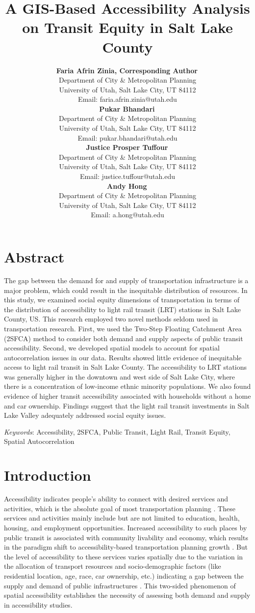 \documentclass[numbered]{trbunofficial}
\title{A GIS-Based Accessibility Analysis on Transit Equity in Salt Lake County}
\author{%
  \textbf{Faria Afrin Zinia, Corresponding Author\,\orcidlink{0000-0001-6525-1968}}\\
  Department of City \& Metropolitan Planning\\
  University of Utah, Salt Lake City, UT 84112\\
  Email: faria.afrin.zinia@utah.edu\\
  \hfill\break%
  \textbf{Pukar Bhandari\,\orcidlink{0000-0002-1043-2937}}\\
  Department of City \& Metropolitan Planning\\
  University of Utah, Salt Lake City, UT 84112\\
  Email: pukar.bhandari@utah.edu\\
    \hfill\break%
  \textbf{Justice Prosper Tuffour\,\orcidlink{0000-0001-8672-6854}}\\
  Department of City \& Metropolitan Planning\\
  University of Utah, Salt Lake City, UT 84112\\
  Email: justice.tuffour@utah.edu\\
    \hfill\break%
  \textbf{Andy Hong\,\orcidlink{0000-0002-1295-1431}}\\
  Department of City \& Metropolitan Planning\\
  University of Utah, Salt Lake City, UT 84112\\
  Email: a.hong@utah.edu\\
}
\begin{document}
\maketitle

\section{Abstract}

 The gap between the demand for and supply of transportation infrastructure is a major problem, which could result in the inequitable distribution of resources. In this study, we examined social equity dimensions of transportation in terms of the distribution of accessibility to light rail transit (LRT) stations in Salt Lake County, US. This research employed two novel methods seldom used in transportation research. First, we used the Two-Step Floating Catchment Area (2SFCA) method to consider both demand and supply aspects of public transit accessibility. Second, we developed spatial models to account for spatial autocorrelation issues in our data. Results showed little evidence of inequitable access to light rail transit in Salt Lake County. The accessibility to LRT stations was generally higher in the downtown and west side of Salt Lake City, where there is a concentration of low-income ethnic minority populations. We also found evidence of higher transit accessibility associated with households without a home and car ownership. Findings suggest that the light rail transit investments in Salt Lake Valley adequately addressed social equity issues.

\hfill\break%
\noindent\textit{Keywords}: Accessibility, 2SFCA, Public Transit, Light Rail, Transit Equity, Spatial Autocorrelation
\newpage

\section{Introduction}
Accessibility indicates people’s ability to connect with desired services and activities, which is the absolute goal of most transportation planning \cite{Litman2021}.  These services and activities mainly include but are not limited to education, health, housing, and employment opportunities.  Increased accessibility to such places by public transit is associated with community livability and economy, which results in the paradigm shift to accessibility-based transportation planning growth \cite{Hansen1959,Iacono2010,Litman2021}.  But the level of accessibility to these services varies spatially due to the variation in the allocation of transport resources and socio-demographic factors (like residential location, age, race, car ownership, etc.) indicating a gap between the supply and demand of public infrastructures \cite{Neutens2015}.  This two-sided phenomenon of spatial accessibility establishes the necessity of assessing both demand and supply in accessibility studies.
\end{document}
